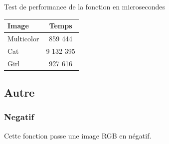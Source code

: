 \documentclass{article}
\begin{document}
\begin{center}
\medbreak
Test de performance de la fonction en microsecondes
\bigbreak
   \begin{tabular}{ | l | c | }
     \hline
     Image & Temps \\
     \hline
     Multicolor & 859 444 \\
     \hline
     Cat & 9 132 395 \\
     \hline
     Girl & 927 616 \\
     \hline
   \end{tabular}
 \end{center}

\newpage
\subsection{Autre}
\subsubsection{Negatif}

Cette fonction passe une image RGB en négatif.
\end{document}
